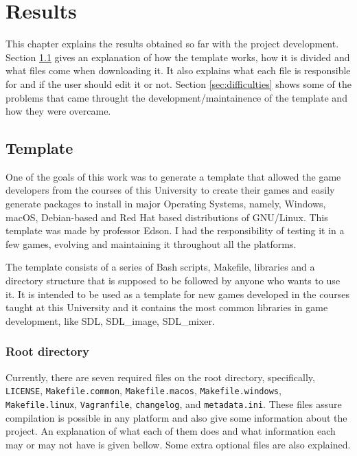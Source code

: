 \chapter[Results]{Results}
\label{sec:results}

This chapter explains the results obtained so far with the project development. Section \ref{sec:template} gives an explanation of how the template works, how it is divided and what files come when downloading it. It also explains what each file is responsible for and if the user should edit it or not. Section \ref{sec:difficulties} shows some of the problems that came throught the development/maintainence of the template and how they were overcame.


\section{Template}
\label{sec:template}

One of the goals of this work was to generate a template that allowed the game developers from the courses of this University to create their games and easily generate packages to install in major Operating Systems, namely, Windows, macOS, Debian-based and Red Hat based distributions of GNU/Linux. This template was made by professor Edson.  I had the responsibility of testing it in a few games, evolving and maintaining it throughout all the platforms.

The template consists of a series of Bash scripts, Makefile, libraries and a directory structure that is supposed to be followed by anyone who wants to use it. It is intended to be used as a template for new games developed in the courses taught at this University and it contains the most common libraries in game development, like SDL, SDL\_image, SDL\_mixer.

\subsection{Root directory}
\label{sec:root_directory}

Currently, there are seven required files on the root directory, specifically, \texttt{LICENSE}, \texttt{Makefile.common}, \texttt{Makefile.macos}, \texttt{Makefile.windows}, \texttt{Makefile.linux}, \texttt{Vagranfile}, \texttt{changelog}, and \texttt{metadata.ini}. These files assure compilation is possible in any platform and also give some information about the project. An explanation of what each of them does and what information each may or may not have is given bellow. Some extra optional files are also explained.

